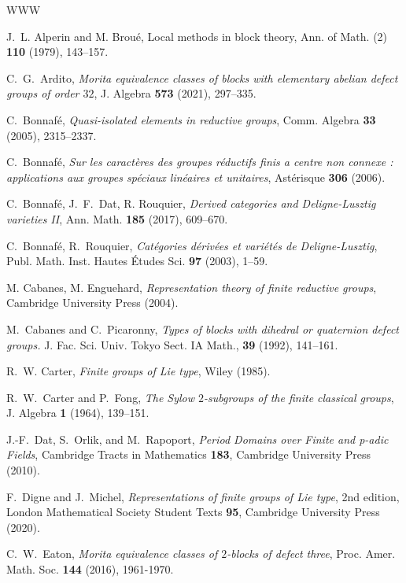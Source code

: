 \documentclass{amsart}
\theoremstyle{plain}\newtheorem{Theorem}{Theorem}[section]
\theoremstyle{plain}\newtheorem{Conjecture}[Theorem]{Conjecture}
\theoremstyle{plain}\newtheorem{Corollary}[Theorem]{Corollary}
\theoremstyle{plain}\newtheorem{Lemma}[Theorem]{Lemma}
\theoremstyle{plain}\newtheorem{Proposition}[Theorem]{Proposition}
\theoremstyle{definition}\newtheorem{Definition}[Theorem]{Definition}
\theoremstyle{definition}\newtheorem{Example}[Theorem]{Example}
\theoremstyle{definition}\newtheorem{Examples}[Theorem]{Examples}
\theoremstyle{definition}\newtheorem{Exercise}[Theorem]{Exercise}
\theoremstyle{definition}\newtheorem{Notation}[Theorem]{Notation}
\theoremstyle{definition}\newtheorem{Remark}[Theorem]{Remark}
\theoremstyle{definition}\newtheorem{Remarks}[Theorem]{Remarks}
\numberwithin{equation}{section}
\begin{document}
\begin{thebibliography}{WWW}


J.~L. Alperin and M. Brou\'e, Local methods in block theory, Ann. of Math. (2) {\bf 110} (1979), 143--157.


 C.~G.~Ardito, \emph{Morita equivalence classes of blocks with elementary abelian defect groups of order $32$}, J. Algebra {\bf573} (2021), 297--335.

C.~Bonnaf\'e, \emph{Quasi-isolated elements in reductive groups}, Comm. Algebra {\bf 33} (2005), 2315--2337.

C.~Bonnaf\'e, \emph{Sur les caract\`eres des groupes r\'eductifs finis a
  centre non connexe : applications aux groupes sp\'eciaux lin\'eaires et
  unitaires},  Ast\'erisque {\bf306} (2006).

  C.~Bonnaf\'e,  J.~F.~Dat, R. Rouquier, \emph{Derived categories and  Deligne-Lusztig varieties II},   Ann. Math. {\bf185} (2017),
  609--670.

  C.~Bonnaf\'e, R.~Rouquier, \emph{Cat\'egories d\'eriv\'ees et vari\'et\'es
  de Deligne-Lusztig}, Publ. Math. Inst. Hautes \'Etudes Sci. {\bf97} (2003),
  1--59.



  M. Cabanes, M. Enguehard, {\em Representation theory of finite reductive groups}, Cambridge University Press  (2004).

M.~Cabanes and C.~Picaronny, {\em Types of blocks with dihedral or quaternion defect groups.} {J. Fac. Sci. Univ. Tokyo Sect. IA Math.}, {\bf39} (1992), 141--161.

 R.~W. Carter, {\em  Finite groups  of  Lie type}, Wiley (1985).

R.~W.~Carter and P.~Fong, \emph{The Sylow $2$-subgroups of the finite classical groups}, J. Algebra {\bf 1} (1964), 139--151.

J.-F.~Dat, S.~Orlik,  and M.~Rapoport, \emph{Period Domains over Finite and p-adic Fields}, Cambridge Tracts in Mathematics \textbf{183}, Cambridge University Press (2010).

 F.~Digne and J.~Michel, {\em Representations of finite groups of Lie type}, 2nd edition, London Mathematical Society Student Texts {\bf 95}, Cambridge University Press (2020).

 C.~W.~Eaton, \emph{Morita equivalence classes of $2$-blocks of defect three}, Proc. Amer. Math. Soc. {\bf144} (2016), 1961-1970.


\end{thebibliography}
\end{document}
